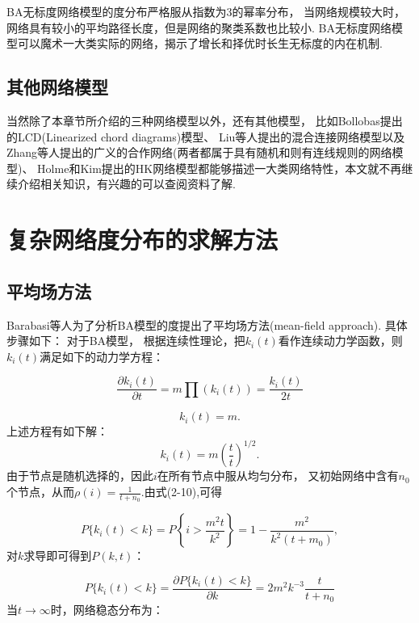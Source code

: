 \documentclass[bachelor,adobefonts]{jnuthesis}
\begin{document}
BA无标度网络模型的度分布严格服从指数为3的幂率分布，
当网络规模较大时，网络具有较小的平均路径长度，但是网络的聚类系数也比较小.
BA无标度网络模型可以魔术一大类实际的网络，揭示了增长和择优时长生无标度的内在机制.


\subsection{其他网络模型}

当然除了本章节所介绍的三种网络模型以外，还有其他模型，
比如Bollobas提出的LCD(Linearized chord diagrams)模型、
Liu等人提出的混合连接网络模型以及Zhang等人提出的广义的合作网络(两者都属于具有随机和则有连线规则的网络模型)、
Holme和Kim提出的HK网络模型都能够描述一大类网络特性，本文就不再继续介绍相关知识，有兴趣的可以查阅资料了解.

\section{复杂网络度分布的求解方法}
\subsection{平均场方法}
Barabasi等人为了分析BA模型的度提出了平均场方法(mean-field approach).
具体步骤如下：
对于BA模型，
根据连续性理论，把$k_i(t)$看作连续动力学函数，则$k_i(t)$满足如下的动力学方程：

\begin{equation}
  \frac{\partial k_i(t)}{\partial t} = 
  m\prod (k_i(t)) = \frac{k_i(t)}{2t}
\end{equation}

$$k_i(t) = m.$$
上述方程有如下解：
\begin{equation}
  k_i(t) = m\left( \frac{t}{t} \right)^{1/2}.
\end{equation}
由于节点是随机选择的，因此$i$在所有节点中服从均匀分布，
又初始网络中含有$n_0$个节点，从而$\rho (i) = \frac{1}{t+n_0}$.由式(2-10),可得

\begin{equation}
  P\{k_i(t)<k\} = P\left\{ i>\frac{m^2t}{k^2}\right\}
  = 1-\frac{m^2}{k^2(t+m_0)},
\end{equation}
对$k$求导即可得到$P(k,t)$：

\begin{equation}
  P\{k_i(t)<k\} = \frac{\partial P\{k_i(t)<k\}}{\partial k} = 
  2m^2k^{-3}\frac{t}{t+n_0}
\end{equation}
当$t \rightarrow \infty$时，网络稳态分布为：
\end{document}

